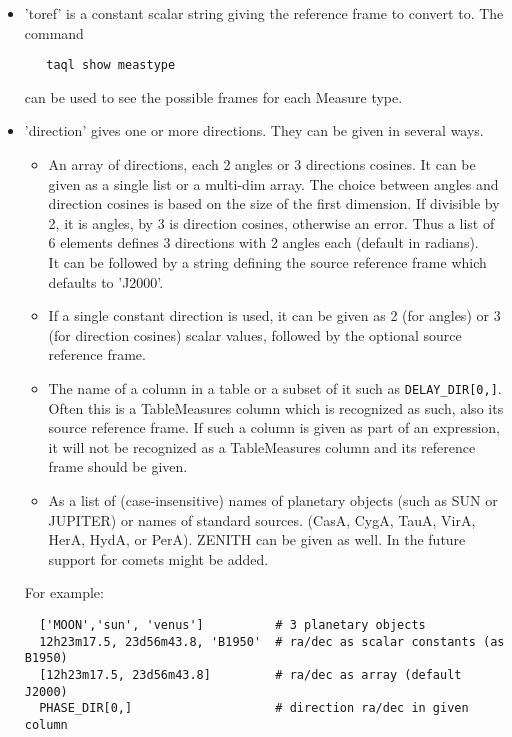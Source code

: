 \begin{itemize}
\item 'toref' is a constant scalar string giving the reference frame to
  convert to. The command
\begin{verbatim}
   taql show meastype
\end{verbatim}
can be used to see the possible frames for each Measure type.

\item 'direction' gives one or more directions. They can be
  given in several ways.
  \begin{itemize}
  \item An array of directions, each 2 angles or 3 directions cosines.
    It can be given as a single list or a multi-dim array. The choice
    between angles and direction cosines is based on the size of the
    first dimension. If divisible by 2, it is angles, by 3 is
    direction cosines, otherwise an error. Thus a list of 6 elements
    defines 3 directions with 2 angles each (default in radians).
    \\It can be followed by a string defining the source
    reference frame which defaults to 'J2000'.
  \item If a single constant direction is used, it can be given as
    2 (for angles) or 3 (for direction cosines) scalar values,
    followed by the optional source reference frame.
  \item The name of a column in a table or a subset of it such as
    \texttt{DELAY\_DIR[0,]}. Often this is a TableMeasures column
    which is recognized as such, also its source reference frame.
    If such a column is given as part of an expression, it will not
    be recognized as a TableMeasures column and its reference frame
    should be given.
  \item As a list of (case-insensitive) names of planetary objects
    (such as SUN or JUPITER) or names of standard sources.
    (CasA, CygA, TauA, VirA, HerA, HydA, or PerA). ZENITH can be
    given as well.
    In the future support for comets might be added. 
  \end{itemize}
  For example:
\begin{verbatim}
  ['MOON','sun', 'venus']          # 3 planetary objects
  12h23m17.5, 23d56m43.8, 'B1950'  # ra/dec as scalar constants (as B1950)
  [12h23m17.5, 23d56m43.8]         # ra/dec as array (default J2000)
  PHASE_DIR[0,]                    # direction ra/dec in given column
\end{verbatim}


\end{itemize}
